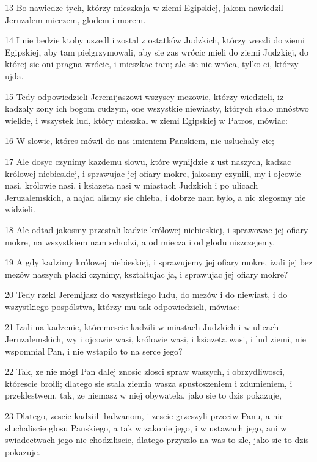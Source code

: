 \par 13 Bo nawiedze tych, którzy mieszkaja w ziemi Egipskiej, jakom nawiedzil Jeruzalem mieczem, glodem i morem.
\par 14 I nie bedzie ktoby uszedl i zostal z ostatków Judzkich, którzy weszli do ziemi Egipskiej, aby tam pielgrzymowali, aby sie zas wrócic mieli do ziemi Judzkiej, do której sie oni pragna wrócic, i mieszkac tam; ale sie nie wróca, tylko ci, którzy ujda.
\par 15 Tedy odpowiedzieli Jeremijaszowi wszyscy mezowie, którzy wiedzieli, iz kadzaly zony ich bogom cudzym, one wszystkie niewiasty, których stalo mnóstwo wielkie, i wszystek lud, który mieszkal w ziemi Egipskiej w Patros, mówiac:
\par 16 W slowie, któres mówil do nas imieniem Panskiem, nie usluchaly cie;
\par 17 Ale dosyc czynimy kazdemu slowu, które wynijdzie z ust naszych, kadzac królowej niebieskiej, i sprawujac jej ofiary mokre, jakosmy czynili, my i ojcowie nasi, królowie nasi, i ksiazeta nasi w miastach Judzkich i po ulicach Jeruzalemskich, a najad alismy sie chleba, i dobrze nam bylo, a nic zlegosmy nie widzieli.
\par 18 Ale odtad jakosmy przestali kadzic królowej niebieskiej, i sprawowac jej ofiary mokre, na wszystkiem nam schodzi, a od miecza i od glodu niszczejemy.
\par 19 A gdy kadzimy królowej niebieskiej, i sprawujemy jej ofiary mokre, izali jej bez mezów naszych placki czynimy, ksztaltujac ja, i sprawujac jej ofiary mokre?
\par 20 Tedy rzekl Jeremijasz do wszystkiego ludu, do mezów i do niewiast, i do wszystkiego pospólstwa, którzy mu tak odpowiedzieli, mówiac:
\par 21 Izali na kadzenie, któremescie kadzili w miastach Judzkich i w ulicach Jeruzalemskich, wy i ojcowie wasi, królowie wasi, i ksiazeta wasi, i lud ziemi, nie wspomnial Pan, i nie wstapilo to na serce jego?
\par 22 Tak, ze nie mógl Pan dalej znosic zlosci spraw waszych, i obrzydliwosci, którescie broili; dlatego sie stala ziemia wasza spustoszeniem i zdumieniem, i przeklestwem, tak, ze niemasz w niej obywatela, jako sie to dzis pokazuje,
\par 23 Dlatego, zescie kadziili balwanom, i zescie grzeszyli przeciw Panu, a nie sluchaliscie glosu Panskiego, a tak w zakonie jego, i w ustawach jego, ani w swiadectwach jego nie chodziliscie, dlatego przyszlo na was to zle, jako sie to dzis pokazuje.
